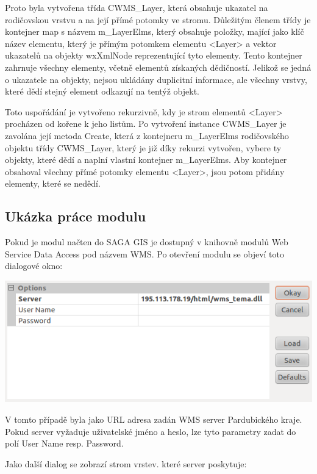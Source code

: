\documentclass[a4paper,12pt]{article}
\begin{document}
Proto byla vytvořena třída CWMS\_Layer, která obsahuje ukazatel na
rodičovskou vrstvu a na její přímé potomky ve stromu. Důležitým členem
třídy je kontejner map s názvem m\_LayerElms, který obsahuje položky,
mající jako klíč název elementu, který je přímým potomkem elementu
<Layer> a vektor ukazatelů na objekty wxXmlNode reprezentující tyto
elementy. Tento kontejner zahrnuje všechny elementy, včetně elementů
získaných dědičností. Jelikož se jedná o ukazatele na objekty, nejsou
ukládány duplicitní informace, ale všechny vrstvy, které dědí stejný
element odkazují na tentýž objekt.

Toto uspořádání je vytvořeno rekurzivně, kdy je strom elementů <Layer>
procházen od kořene k jeho listům. Po vytvoření instance CWMS\_Layer
je zavolána její metoda Create, která z kontejneru m\_LayerElms
rodičovského objektu třídy CWMS\_Layer, který je již díky rekurzi
vytvořen, vybere ty objekty, které dědí a naplní vlastní kontejner
m\_LayerElms. Aby kontejner obsahoval všechny přímé potomky elementu
<Layer>, jsou potom přidány elementy, které se nedědí.

\subsection{Ukázka práce modulu}

Pokud je modul načten do SAGA GIS je dostupný v knihovně modulů Web
Service Data Access pod názvem WMS. Po otevření modulu se objeví toto
dialogové okno:

 \includegraphics[scale=0.4]{figures/SAGA_okno1.png}

V tomto případě byla jako URL adresa zadán WMS server Pardubického
kraje.  Pokud server vyžaduje uživatelské jméno a heslo, lze tyto
parametry zadat do polí User Name resp. Password.

Jako další dialog se zobrazí strom vrstev. které server poskytuje:
\end{document}
